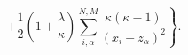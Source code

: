 \begin{equation}
	\left.+
	\frac{1}{2}
	\left(1+\frac{\lambda}{\kappa}\right)
	\sum_{i,\alpha}^{N,M} \frac{\kappa(\kappa-1)}{(x_{i}-z_{\alpha})^2}
	\right\} .
\end{equation} 
